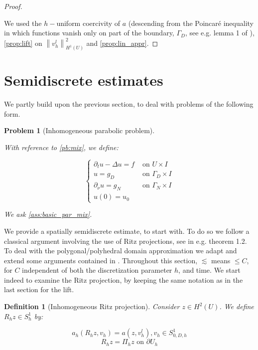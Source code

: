 \documentclass[english,a4paper,9pt,oneside]{scrbook}	%
\theoremstyle{break}
\newtheorem{defn}[equation]{Definition}
\newtheorem{pb}[equation]{Problem}
\newenvironment{mproof}[1][\proofname]{%
  \begin{proof}[#1]$ $\par\nobreak\ignorespaces
}{%
  \end{proof}
}
\renewcommand*{\proofname}{Proof}
\theoremstyle{remark}
\newcommand{\norm}[1]{\left\lVert#1\right\rVert}
\begin{document}
\begin{appendices}
\begin{mproof}
We used the $h-$uniform coercivity of $a$ (descending from the Poincaré inequality in which functions vanish only on part of the boundary, $\Gamma_D$, see e.g. lemma 1 of \cite{dorfler}), \cref{prop:lift} on $\norm{v_h^l}_{H^1(U)}^2$ and \cref{prop:lin_appr}.
\end{mproof}

\section{Semidiscrete estimates}
\label{sec:semid}
We partly build upon the previous section, to deal with problems of the following form.

\begin{pb}[Inhomogeneous parabolic problem]
\label{pb:inh_parabolic}

With reference to \cref{pb:mix}, we define:

$$
\left\{\begin{matrix}
\partial_t u-\Delta u = f & \text{ on } U \times I \\ 
u = g_D & \text{ on } \Gamma_D \times I\\ 
\partial_\nu u = g_N & \text{ on } \Gamma_N \times I \\
u(0) =  u_0
\end{matrix}\right.
$$

We ask \cref{ass:basic_par_mix}.

\end{pb}

We provide a spatially semidiscrete estimate, to start with. To do so we follow a classical argument involving the use of Ritz projections, see \cite{thomee} in e.g. theorem 1.2. To deal with the polygonal/polyhedral domain approximation we adapt and extend some arguments contained in \cite{ranner}.
Throughout this section, $\lesssim$ means $\leq C $, for $C$ independent of both the discretization parameter $h$, and time.
We start indeed to examine the Ritz projection, by keeping the same notation as in the last section for the lift.


\begin{defn}[Inhomogeneous Ritz projection]
Consider $z \in H^2(U)$. We define $R_h z \in S^1_h$ by:

$$a_h(R_h z , v_h) = a(z, v_h^l), v_h \in S^1_{0,D,h}$$
$$R_h z = \Pi_h z \text{ on } \partial U_h$$


\end{defn}
\end{appendices}
\end{document}
